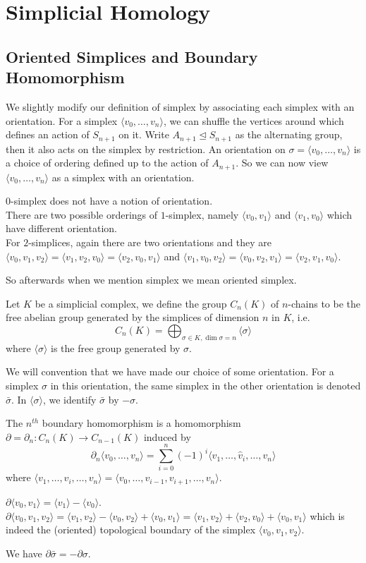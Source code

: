 \section{Simplicial Homology}
\subsection{Oriented Simplices and Boundary Homomorphism}
We slightly modify our definition of simplex by associating each simplex with an orientation.
For a simplex $\langle v_0,\ldots,v_n\rangle$, we can shuffle the vertices around which defines an action of $S_{n+1}$ on it.
Write $A_{n+1}\unlhd S_{n+1}$ as the alternating group, then it also acts on the simplex by restriction.
An orientation on $\sigma=\langle v_0,\ldots,v_n\rangle$ is a choice of ordering defined up to the action of $A_{n+1}$.
So we can now view $\langle v_0,\ldots,v_n\rangle$ as a simplex with an orientation.
\begin{example}
    $0$-simplex does not have a notion of orientation.\\
    There are two possible orderings of $1$-simplex, namely $\langle v_0,v_1\rangle$ and $\langle v_1,v_0\rangle$ which have different orientation.\\
    For $2$-simplices, again there are two orientations and they are $\langle v_0,v_1,v_2\rangle=\langle v_1,v_2,v_0\rangle=\langle v_2,v_0,v_1\rangle$ and $\langle v_1,v_0,v_2\rangle=\langle v_0,v_2,v_1\rangle=\langle v_2,v_1,v_0\rangle$.
\end{example}
So afterwards when we mention simplex we mean oriented simplex.
\begin{definition}
    Let $K$ be a simplicial complex, we define the group $C_n(K)$ of $n$-chains to be the free abelian group generated by the simplices of dimension $n$ in $K$, i.e.
    $$C_n(K)=\bigoplus_{\sigma\in K,\dim\sigma=n}\langle\sigma\rangle$$
    where $\langle\sigma\rangle$ is the free group generated by $\sigma$.
\end{definition}
We will convention that we have made our choice of some orientation.
For a simplex $\sigma$ in this orientation, the same simplex in the other orientation is denoted $\bar\sigma$.
In $\langle\sigma\rangle$, we identify $\bar\sigma$ by $-\sigma$.
\begin{definition}
    The $n^{th}$ boundary homomorphism is a homomorphism $\partial=\partial_n:C_n(K)\to C_{n-1}(K)$ induced by
    $$\partial_n\langle v_0,\ldots,v_n\rangle = \sum_{i=0}^n(-1)^i\langle v_1,\ldots,\hat{v}_i,\ldots,v_n\rangle$$
    where $\langle v_1,\ldots,\hat{v}_i,\ldots,v_n\rangle=\langle v_0,\ldots,v_{i-1},v_{i+1},\ldots,v_n\rangle$.
\end{definition}
\begin{example}
    $\partial\langle v_0,v_1\rangle=\langle v_1\rangle-\langle v_0\rangle$.
    $\partial\langle v_0,v_1,v_2\rangle=\langle v_1,v_2\rangle-\langle v_0,v_2\rangle+\langle v_0,v_1\rangle=\langle v_1,v_2\rangle+\langle v_2,v_0\rangle+\langle v_0,v_1\rangle$ which is indeed the (oriented) topological boundary of the simplex $\langle v_0,v_1,v_2\rangle$.
\end{example}
\begin{remark}
    We have $\partial\bar\sigma=-\partial\sigma$.
\end{remark}
